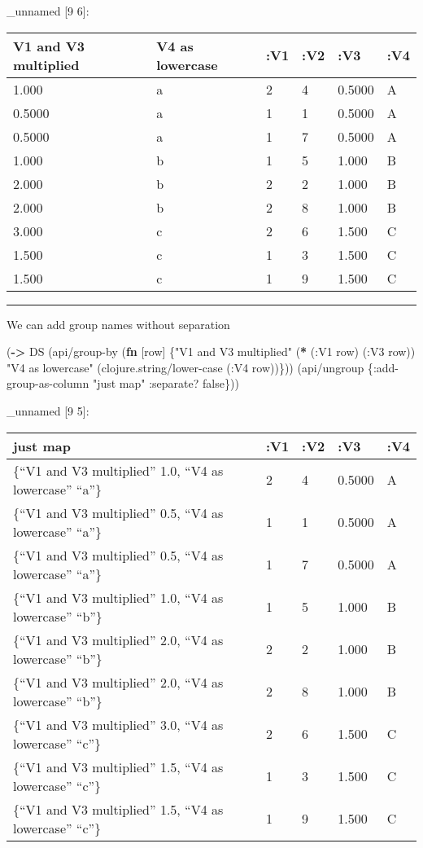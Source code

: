 \documentclass[]{article}
\newenvironment{Shaded}{\begin{snugshade}}{\end{snugshade}}
\newcommand{\KeywordTok}[1]{\textcolor[rgb]{0.13,0.29,0.53}{\textbf{#1}}}
\newcommand{\StringTok}[1]{\textcolor[rgb]{0.31,0.60,0.02}{#1}}
\newcommand{\VariableTok}[1]{\textcolor[rgb]{0.00,0.00,0.00}{#1}}
\newcommand{\AttributeTok}[1]{\textcolor[rgb]{0.77,0.63,0.00}{#1}}
\newcommand{\NormalTok}[1]{#1}
\begin{document}
\_unnamed {[}9 6{]}:

\begin{longtable}[]{@{}llllll@{}}
\toprule
V1 and V3 multiplied & V4 as lowercase & :V1 & :V2 & :V3 &
:V4\tabularnewline
\midrule
\endhead
1.000 & a & 2 & 4 & 0.5000 & A\tabularnewline
0.5000 & a & 1 & 1 & 0.5000 & A\tabularnewline
0.5000 & a & 1 & 7 & 0.5000 & A\tabularnewline
1.000 & b & 1 & 5 & 1.000 & B\tabularnewline
2.000 & b & 2 & 2 & 1.000 & B\tabularnewline
2.000 & b & 2 & 8 & 1.000 & B\tabularnewline
3.000 & c & 2 & 6 & 1.500 & C\tabularnewline
1.500 & c & 1 & 3 & 1.500 & C\tabularnewline
1.500 & c & 1 & 9 & 1.500 & C\tabularnewline
\bottomrule
\end{longtable}

\begin{center}\rule{0.5\linewidth}{0.5pt}\end{center}

We can add group names without separation

\begin{Shaded}
\begin{Highlighting}[]
\NormalTok{(}\KeywordTok{->}\NormalTok{ DS}
\NormalTok{    (api/group-by (}\KeywordTok{fn}\NormalTok{ [row] \{}\StringTok{"V1 and V3 multiplied"}\NormalTok{ (}\KeywordTok{*}\NormalTok{ (}\AttributeTok{:V1}\NormalTok{ row)}
\NormalTok{                                                      (}\AttributeTok{:V3}\NormalTok{ row))}
                            \StringTok{"V4 as lowercase"}\NormalTok{ (clojure.string/lower-case (}\AttributeTok{:V4}\NormalTok{ row))\}))}
\NormalTok{    (api/ungroup \{}\AttributeTok{:add-group-as-column} \StringTok{"just map"}
                  \AttributeTok{:separate}\NormalTok{? }\VariableTok{false}\NormalTok{\}))}
\end{Highlighting}
\end{Shaded}

\_unnamed {[}9 5{]}:

\begin{longtable}[]{@{}lllll@{}}
\toprule
just map & :V1 & :V2 & :V3 & :V4\tabularnewline
\midrule
\endhead
\{``V1 and V3 multiplied'' 1.0, ``V4 as lowercase'' ``a''\} & 2 & 4 &
0.5000 & A\tabularnewline
\{``V1 and V3 multiplied'' 0.5, ``V4 as lowercase'' ``a''\} & 1 & 1 &
0.5000 & A\tabularnewline
\{``V1 and V3 multiplied'' 0.5, ``V4 as lowercase'' ``a''\} & 1 & 7 &
0.5000 & A\tabularnewline
\{``V1 and V3 multiplied'' 1.0, ``V4 as lowercase'' ``b''\} & 1 & 5 &
1.000 & B\tabularnewline
\{``V1 and V3 multiplied'' 2.0, ``V4 as lowercase'' ``b''\} & 2 & 2 &
1.000 & B\tabularnewline
\{``V1 and V3 multiplied'' 2.0, ``V4 as lowercase'' ``b''\} & 2 & 8 &
1.000 & B\tabularnewline
\{``V1 and V3 multiplied'' 3.0, ``V4 as lowercase'' ``c''\} & 2 & 6 &
1.500 & C\tabularnewline
\{``V1 and V3 multiplied'' 1.5, ``V4 as lowercase'' ``c''\} & 1 & 3 &
1.500 & C\tabularnewline
\{``V1 and V3 multiplied'' 1.5, ``V4 as lowercase'' ``c''\} & 1 & 9 &
1.500 & C\tabularnewline
\bottomrule
\end{longtable}
\end{document}
